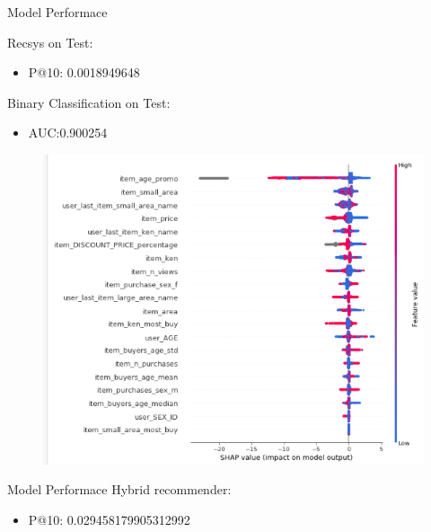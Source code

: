 \documentclass{beamer}
\begin{document}
\begin{frame}{Model Performace}

	Recsys on Test:
	\begin{itemize}
		\item P@10: 0.0018949648 
	\end{itemize}
	 
	Binary Classification on Test: 
		\begin{itemize}
			\item AUC:0.900254
		\end{itemize}
	
	\begin{figure}
	\centering
	\includegraphics[width=0.7\linewidth]{../img/shap}
	\label{fig:shap}
	\end{figure}
\end{frame}

\begin{frame}{Model Performace}
	Hybrid recommender:

	\begin{itemize}
		\item P@10: 0.029458179905312992
	\end{itemize}
	
\end{frame}
	
\end{document}
